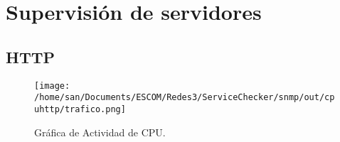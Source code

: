 \documentclass[twoside]{article}
\begin{document}
% 
\selectfont
\tableofcontents
\newpage

\section{Supervisi\'on de servidores}

\subsection{HTTP}

\begin{figure}[!htb]
  \centering
  \texttt{[image: /home/san/Documents/ESCOM/Redes3/ServiceChecker/snmp/out/cpuhttp/trafico.png]}
  \caption{Gr\'afica de Actividad de CPU.}
\end{figure}


\end{document}
